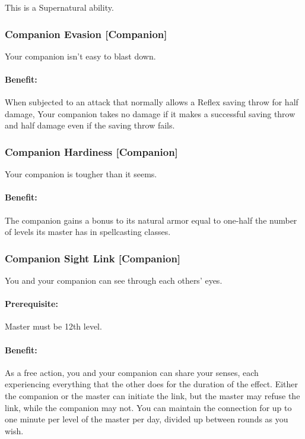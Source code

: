 This is a Supernatural ability.
\subsubsection[Companion Evasion]{Companion Evasion [Companion]}
\label{Feat:CompanionEvasion}
Your companion isn't easy to blast down.

\paragraph{Benefit:} When subjected to an attack that normally allows a Reflex saving throw for half damage, 
Your companion takes no damage if it makes a successful saving throw and half damage even if the saving throw fails. 

\subsubsection[Companion Hardiness]{Companion Hardiness [Companion]}
\label{Feat:CompanionHardiness}
Your companion is tougher than it seems.

\paragraph{Benefit:} The companion gains a bonus to its natural armor equal to one-half the number of levels its master has in spellcasting classes.

\subsubsection[Companion Sight Link]{Companion Sight Link [Companion]}
\label{Feat:CompanionSightLink}
You and your companion can see through each others' eyes.

\paragraph{Prerequisite:} Master must be 12th level.

\paragraph{Benefit:} As a free action, you and your companion can share your senses, each experiencing everything that the other does for the duration of the effect.
Either the companion or the master can initiate the link, but the master may refuse the link, while the companion may not.
You can maintain the connection for up to one minute per level of the master per day, divided up between rounds as you wish. 

